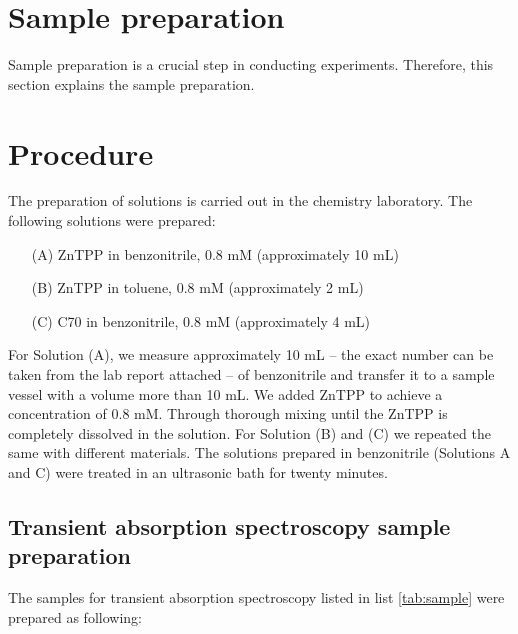 \section{Sample preparation}
\label{sec:Sampleprep}

Sample preparation is a crucial step in conducting experiments. Therefore, this section explains the sample preparation.

\section*{Procedure}

The preparation of solutions is carried out in the chemistry laboratory. The following solutions were prepared:

\begin{enumerate}
\item[(A)] ZnTPP in benzonitrile, 0.8 mM (approximately 10 mL)
\item[(B)] ZnTPP in toluene, 0.8 mM (approximately 2 mL)
\item[(C)] C70 in benzonitrile, 0.8 mM (approximately 4 mL)
\end{enumerate}

For Solution (A), we measure approximately 10 mL -- the exact number can be taken from the
lab report attached -- of benzonitrile and transfer it to a sample vessel with a volume more than 10 mL.
We added ZnTPP to achieve a concentration of 0.8 mM. Through thorough mixing until the ZnTPP is completely
dissolved in the solution.
For Solution (B) and (C) we repeated the same with different materials.
The solutions prepared in benzonitrile (Solutions A and C) were treated in an ultrasonic bath for twenty minutes.


\subsection*{Transient absorption spectroscopy sample preparation}

The samples for transient absorption spectroscopy listed in list \cref{tab:sample} were prepared as following:



